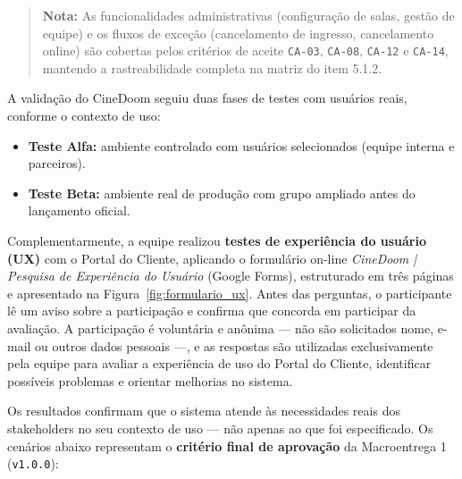 \begin{quote}
\textbf{Nota:} As funcionalidades administrativas (configuração de salas, gestão de equipe) e os fluxos de exceção (cancelamento de ingresso, cancelamento online) são cobertas pelos critérios de aceite \texttt{CA-03}, \texttt{CA-08}, \texttt{CA-12} e \texttt{CA-14}, mantendo a rastreabilidade completa na matriz do item 5.1.2.
\end{quote}


A validação do CineDoom seguiu duas fases de testes com usuários reais, conforme o contexto de uso:

\begin{itemize}
\item \textbf{Teste Alfa:} ambiente controlado com usuários selecionados (equipe interna e parceiros).
\item \textbf{Teste Beta:} ambiente real de produção com grupo ampliado antes do lançamento oficial.
\end{itemize}

Complementarmente, a equipe realizou \textbf{testes de experiência do usuário (UX)} com o Portal do Cliente, aplicando o formulário on-line \emph{CineDoom | Pesquisa de Experiência do Usuário} (Google Forms), estruturado em três páginas e apresentado na Figura~\ref{fig:formulario_ux}. Antes das perguntas, o participante lê um aviso sobre a participação e confirma que concorda em participar da avaliação. A participação é voluntária e anônima — não são solicitados nome, e-mail ou outros dados pessoais —, e as respostas são utilizadas exclusivamente pela equipe para avaliar a experiência de uso do Portal do Cliente, identificar possíveis problemas e orientar melhorias no sistema.


Os resultados confirmam que o sistema atende às necessidades reais dos stakeholders no seu contexto de uso — não apenas ao que foi especificado. Os cenários abaixo representam o \textbf{critério final de aprovação} da Macroentrega 1 (\texttt{v1.0.0}):


